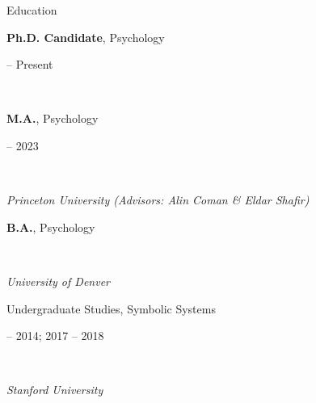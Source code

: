 \documentclass{cv} %
\begin{document}
\nocite{*}


\begin{cvSection}{Education}

  \begin{minipage}[t]{0.80\linewidth}
    \raggedright \textbf{Ph.D. Candidate}, Psychology%
  \end{minipage}
  \hfill
  \begin{minipage}[t]{0.15\linewidth}
     -- Present%
  \end{minipage}
  \\
  \begin{minipage}[t]{0.50\linewidth}
    \raggedright \textbf{M.A.}, Psychology%
  \end{minipage}
  \hfill
  \begin{minipage}[t]{0.45\linewidth}
     -- 2023
  \end{minipage}
  \\
  \begin{minipage}[t]{0.80\linewidth}
    \raggedright \textit{Princeton University (Advisors: Alin Coman \& Eldar Shafir)}%
  \end{minipage}
  \hfill
  \begin{minipage}[t]{0.15\linewidth}
  \end{minipage}


  \begin{minipage}[t]{0.50\linewidth}
    \raggedright \textbf{B.A.}, Psychology%
  \end{minipage}
  \hfill
  \begin{minipage}[t]{0.45\linewidth}
  \end{minipage}
  \\
  \begin{minipage}[t]{0.50\linewidth}
    \raggedright \textit{University of Denver}%
  \end{minipage}
  \hfill
  \begin{minipage}[t]{0.45\linewidth}
  \end{minipage}

  \begin{minipage}[t]{0.50\linewidth}
    \raggedright Undergraduate Studies, Symbolic Systems%
  \end{minipage}
  \hfill
  \begin{minipage}[t]{0.45\linewidth}
     -- 2014; 2017 -- 2018%
  \end{minipage}
  \\
  \begin{minipage}[t]{0.50\linewidth}
    \raggedright \textit{Stanford University}%
  \end{minipage}
  \hfill
  \begin{minipage}[t]{0.45\linewidth}
  \end{minipage}

\end{cvSection}
\end{document}
